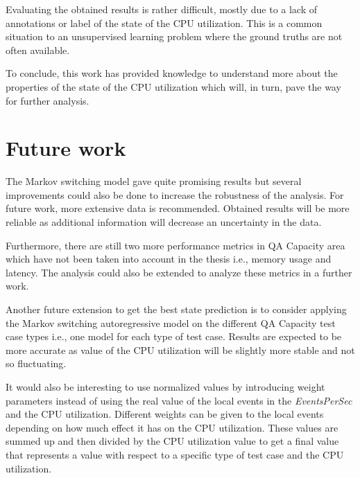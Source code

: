 Evaluating the obtained results is rather difficult, mostly due to
a lack of annotations or label of the state of the CPU utilization.
This is a common situation to an unsupervised learning problem where
the ground truths are not often available. %
\begin{comment}
Besides, another difficulty of using the Markov switching model is
that a state inference is required. Since the Markov switching model
assumed latent states, a sensible inference is needed in order to
get a final and meaningful result that can be further used.
\end{comment}
To conclude, this work has provided knowledge to understand more about
the properties of the state of the CPU utilization which will, in
turn, pave the way for further analysis.

\section{Future work}

The Markov switching model gave quite promising results but several
improvements could also be done to increase the robustness of the
analysis. For future work, more extensive data is recommended. Obtained
results will be more reliable as additional information will decrease
an uncertainty in the data. %
\begin{comment}
As the assumption of the distribution of residuals was not entirely
fulfill, significant details that were used to explained the CPU utilization
might not all be caught by the model. Hence, another future extension
is to consider on the effects of interaction terms or the other predictor
variables, specifically local events in \emph{EventsPerSec}, that
might have an effect on the CPU utilization.
\end{comment}
{} 

Furthermore, there are still two more performance metrics in QA Capacity
area which have not been taken into account in the thesis i.e., memory
usage and latency. The analysis could also be extended to analyze
these metrics in a further work. 

Another future extension to get the best state prediction is to consider
applying the Markov switching autoregressive model on the different
QA Capacity test case types i.e., one model for each type of test
case. Results are expected to be more accurate as value of the CPU
utilization will be slightly more stable and not so fluctuating.

It would also be interesting to use normalized values by introducing
weight parameters instead of using the real value of the local events
in the \emph{EventsPerSec} and the CPU utilization. Different weights
can be given to the local events depending on how much effect it has
on the CPU utilization. These values are summed up and then divided
by the CPU utilization value to get a final value that represents
a value with respect to a specific type of test case and the CPU utilization.

